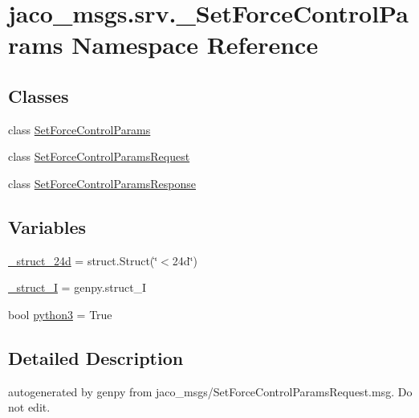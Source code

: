 \hypertarget{namespacejaco__msgs_1_1srv_1_1__SetForceControlParams}{}\section{jaco\+\_\+msgs.\+srv.\+\_\+\+Set\+Force\+Control\+Params Namespace Reference}
\label{namespacejaco__msgs_1_1srv_1_1__SetForceControlParams}
\subsection*{Classes}
\begin{DoxyCompactItemize}
\item 
class \hyperlink{classjaco__msgs_1_1srv_1_1__SetForceControlParams_1_1SetForceControlParams}{Set\+Force\+Control\+Params}
\item 
class \hyperlink{classjaco__msgs_1_1srv_1_1__SetForceControlParams_1_1SetForceControlParamsRequest}{Set\+Force\+Control\+Params\+Request}
\item 
class \hyperlink{classjaco__msgs_1_1srv_1_1__SetForceControlParams_1_1SetForceControlParamsResponse}{Set\+Force\+Control\+Params\+Response}
\end{DoxyCompactItemize}
\subsection*{Variables}
\begin{DoxyCompactItemize}
\item 
\hyperlink{namespacejaco__msgs_1_1srv_1_1__SetForceControlParams_a79b25ab8fa23fe0d07c7594e052b7430}{\+\_\+struct\+\_\+24d} = struct.\+Struct(\char`\"{}$<$24d\char`\"{})
\item 
\hyperlink{namespacejaco__msgs_1_1srv_1_1__SetForceControlParams_a3f9549616949ba39862498841b746189}{\+\_\+struct\+\_\+I} = genpy.\+struct\+\_\+I
\item 
bool \hyperlink{namespacejaco__msgs_1_1srv_1_1__SetForceControlParams_a284dd4cccfd1db48a9c17fcf7fd64522}{python3} = True
\end{DoxyCompactItemize}


\subsection{Detailed Description}
\begin{DoxyVerb}autogenerated by genpy from jaco_msgs/SetForceControlParamsRequest.msg. Do not edit.\end{DoxyVerb}
 

